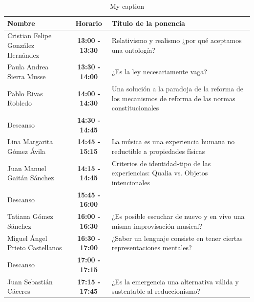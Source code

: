 \documentclass[]{book}
\begin{document}
\begin{table}[]
	\centering
	\caption{My caption}
	\label{my-label}
	\begin{tabular}{@{}lcl@{}}
		\toprule
		\textbf{Nombre}                    & \textbf{Horario}        & \textbf{Título de la ponencia}                                                                       \\ \midrule
		Cristian Felipe González Hernández & \textbf{13:00 - 13:30}  & Relativismo y realismo ¿por qué aceptamos una ontología?                                             \\
		Paula Andrea Sierra Musse          & \textbf{13:30 - 14:00}  & ¿Es la ley necesariamente vaga?                                                                      \\
		Pablo Rivas Robledo                & \textbf{14:00 -  14:30} & Una solución a la paradoja de la reforma de los mecanismos de reforma de las normas constitucionales \\
		Descanso                           & \textbf{14:30 - 14:45}  &                                                                                                      \\
		Lina Margarita Gómez Ávila         & \textbf{14:45 - 15:15}  & La música es una experiencia humana no reductible a propiedades físicas                              \\
		Juan Manuel Gaitán Sánchez         & \textbf{14:15 - 14:45}  & Criterios de identidad-tipo de las experiencias: Qualia vs. Objetos intencionales                    \\
		Descanso                           & \textbf{15:45 - 16:00}  &                                                                                                      \\
		Tatiana Gómez Sánchez              & \textbf{16:00 -  16:30} & ¿Es posible escuchar de nuevo y en vivo una misma improvisación musical?                             \\
		Miguel Ángel Prieto Castellanos    & \textbf{16:30 - 17:00}  & ¿Saber un lenguaje consiste en tener ciertas representaciones mentales?                              \\
		Descanso                           & \textbf{17:00 - 17:15}  &                                                                                                      \\
		Juan Sebastián Cáceres             & \textbf{17:15 - 17:45}  & ¿Es la emergencia una alternativa válida y sustentable al reduccionismo?                             \\ \bottomrule
	\end{tabular}
\end{table}
\end{document}
